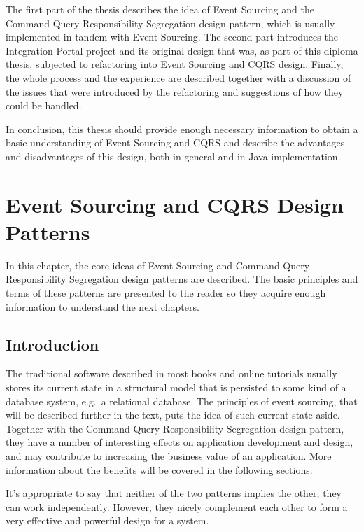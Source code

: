 \documentclass{book}
\begin{document}
The first part of the thesis describes the idea of Event Sourcing and
the Command Query Responsibility Segregation design pattern, which is
usually implemented in tandem with Event Sourcing. The second part
introduces the Integration Portal project and its original design that
was, as part of this diploma thesis, subjected to refactoring into Event
Sourcing and CQRS design. Finally, the whole process and the experience
are described together with a discussion of the issues that were
introduced by the refactoring and suggestions of how they could be
handled.

In conclusion, this thesis should provide enough necessary information
to obtain a basic understanding of Event Sourcing and CQRS and describe
the advantages and disadvantages of this design, both in general and in
Java implementation.


\section{Event Sourcing and CQRS Design
Patterns}\label{event-sourcing-and-cqrs-design-patterns}

In this chapter, the core ideas of Event Sourcing and Command Query
Responsibility Segregation design patterns are described. The basic
principles and terms of these patterns are presented to the reader so
they acquire enough information to understand the next chapters.

\subsection{Introduction}\label{introduction}

The traditional software described in most books and online tutorials
usually stores its current state in a structural model that is persisted
to some kind of a database system, e.g.~a relational database. The
principles of event sourcing, that will be described further in the
text, puts the idea of such current state aside. Together with the
Command Query Responsibility Segregation design pattern, they have a
number of interesting effects on application development and design, and
may contribute to increasing the business value of an application. More
information about the benefits will be covered in the following
sections.

It's appropriate to say that neither of the two patterns implies the
other; they can work independently. However, they nicely complement each
other to form a very effective and powerful design for a system.
\end{document}
